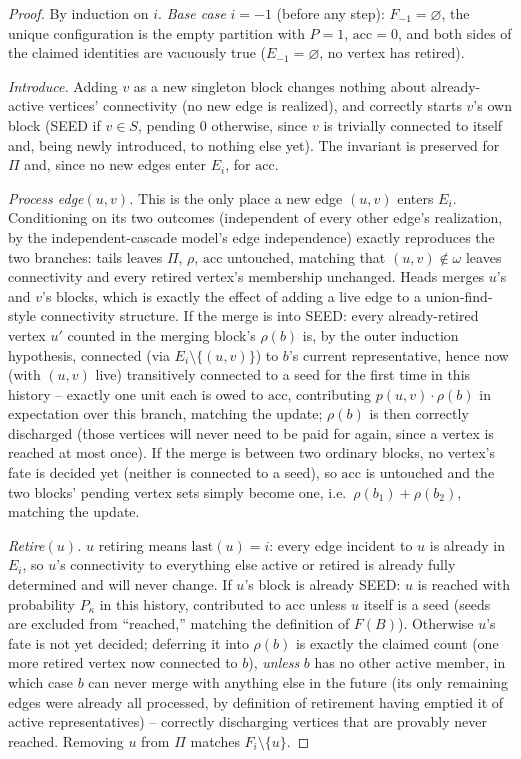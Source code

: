 \documentclass[11pt]{article}
\theoremstyle{definition}
\theoremstyle{remark}
\newcommand{\FF}{F}
\begin{document}
\begin{proof}
By induction on $i$. \emph{Base case} $i=-1$ (before any step): $F_{-1}
=\varnothing$, the unique configuration is the empty partition with $P=1$,
$\mathrm{acc}=0$, and both sides of the claimed identities are vacuously
true ($E_{-1}=\varnothing$, no vertex has retired).

\emph{Introduce.} Adding $v$ as a new singleton block changes nothing about
already-active vertices' connectivity (no new edge is realized), and
correctly starts $v$'s own block (SEED if $v\in S$, pending $0$ otherwise,
since $v$ is trivially connected to itself and, being newly introduced, to
nothing else yet). The invariant is preserved for $\Pi$ and, since no new
edges enter $E_i$, for $\mathrm{acc}$.

\emph{Process edge$(u,v)$.} This is the only place a new edge $(u,v)$
enters $E_i$. Conditioning on its two outcomes (independent of every other
edge's realization, by the independent-cascade model's edge independence)
exactly reproduces the two branches: tails leaves $\Pi$, $\rho$,
$\mathrm{acc}$ untouched, matching that $(u,v)\notin\omega$ leaves
connectivity and every retired vertex's membership unchanged. Heads merges
$u$'s and $v$'s blocks, which is exactly the effect of adding a live edge to
a union-find-style connectivity structure. If the merge is into SEED: every
already-retired vertex $u'$ counted in the merging block's $\rho(b)$ is, by
the outer induction hypothesis, connected (via $E_i\setminus\{(u,v)\}$) to
$b$'s current representative, hence now (with $(u,v)$ live) transitively
connected to a seed for the first time in this history -- exactly one unit
each is owed to $\mathrm{acc}$, contributing $p(u,v)\cdot\rho(b)$ in
expectation over this branch, matching the update; $\rho(b)$ is then
correctly discharged (those vertices will never need to be paid for again,
since a vertex is reached at most once). If the merge is between two
ordinary blocks, no vertex's fate is decided yet (neither is connected to a
seed), so $\mathrm{acc}$ is untouched and the two blocks' pending vertex
sets simply become one, i.e.\ $\rho(b_1)+\rho(b_2)$, matching the update.

\emph{Retire$(u)$.} $u$ retiring means $\mathrm{last}(u)=i$: every edge
incident to $u$ is already in $E_i$, so $u$'s connectivity to everything
else active or retired is already fully determined and will never change.
If $u$'s block is already SEED: $u$ is reached with probability $P_\kappa$
in this history, contributed to $\mathrm{acc}$ unless $u$ itself is a seed
(seeds are excluded from ``reached,'' matching the definition of
$\FF(B)$). Otherwise $u$'s fate is not yet decided; deferring it into
$\rho(b)$ is exactly the claimed count (one more retired vertex now
connected to $b$), \emph{unless} $b$ has no other active member, in which
case $b$ can never merge with anything else in the future (its only
remaining edges were already all processed, by definition of retirement
having emptied it of active representatives) -- correctly discharging
vertices that are provably never reached. Removing $u$ from $\Pi$ matches
$F_i\setminus\{u\}$.
\end{proof}
\end{document}
